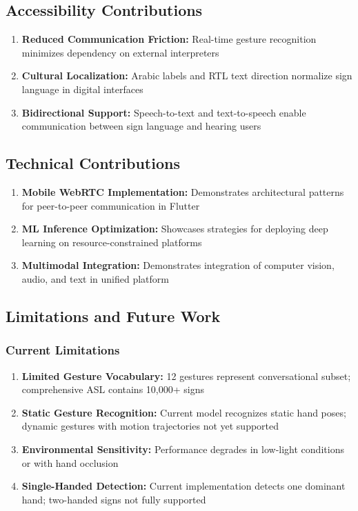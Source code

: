 \documentclass[11pt,a4paper,twoside]{report}
\begin{document}
\subsection{Accessibility Contributions}
\label{subsec:accessibility-contributions}

\begin{enumerate}
    \item \textbf{Reduced Communication Friction:} Real-time gesture recognition minimizes dependency on external interpreters
    \item \textbf{Cultural Localization:} Arabic labels and RTL text direction normalize sign language in digital interfaces
    \item \textbf{Bidirectional Support:} Speech-to-text and text-to-speech enable communication between sign language and hearing users
\end{enumerate}

\subsection{Technical Contributions}
\label{subsec:technical-contributions}

\begin{enumerate}
    \item \textbf{Mobile WebRTC Implementation:} Demonstrates architectural patterns for peer-to-peer communication in Flutter
    \item \textbf{ML Inference Optimization:} Showcases strategies for deploying deep learning on resource-constrained platforms
    \item \textbf{Multimodal Integration:} Demonstrates integration of computer vision, audio, and text in unified platform
\end{enumerate}

\subsection{Limitations and Future Work}
\label{subsec:limitations-future-work}

\subsubsection{Current Limitations}
\label{subsubsec:current-limitations}

\begin{enumerate}
    \item \textbf{Limited Gesture Vocabulary:} 12 gestures represent conversational subset; comprehensive ASL contains 10,000+ signs
    \item \textbf{Static Gesture Recognition:} Current model recognizes static hand poses; dynamic gestures with motion trajectories not yet supported
    \item \textbf{Environmental Sensitivity:} Performance degrades in low-light conditions or with hand occlusion
    \item \textbf{Single-Handed Detection:} Current implementation detects one dominant hand; two-handed signs not fully supported
\end{enumerate}
\end{document}
